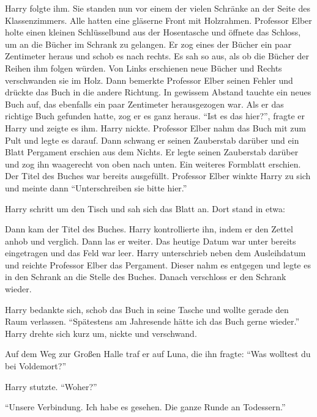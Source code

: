 Harry folgte ihm. Sie standen nun vor einem der vielen Schränke an der Seite des Klassenzimmers. Alle hatten eine gläserne Front mit Holzrahmen. Professor Elber holte einen kleinen Schlüsselbund aus der Hosentasche und öffnete das Schloss, um an die Bücher im Schrank zu gelangen. Er zog eines der Bücher ein paar Zentimeter heraus und schob es nach rechts. Es sah so aus, als ob die Bücher der Reihen ihm folgen würden. Von Links erschienen neue Bücher und Rechts verschwanden sie im Holz. Dann bemerkte Professor Elber seinen Fehler und drückte das Buch in die andere Richtung. In gewissem Abstand tauchte ein neues Buch auf, das ebenfalls ein paar Zentimeter herausgezogen war. Als er das richtige Buch gefunden hatte, zog er es ganz heraus. \enquote{Ist es das hier?}, fragte er Harry und zeigte es ihm. Harry nickte. Professor Elber nahm das Buch mit zum Pult und legte es darauf. Dann schwang er seinen Zauberstab darüber und ein Blatt Pergament erschien aus dem Nichts. Er legte seinen Zauberstab darüber und zog ihn waagerecht von oben nach unten. Ein weiteres Formblatt erschien. Der Titel des Buches war bereits ausgefüllt. Professor Elber winkte Harry zu sich und meinte dann \enquote{Unterschreiben sie bitte hier.}

Harry schritt um den Tisch und sah sich das Blatt an. Dort stand in etwa:


Dann kam der Titel des Buches. Harry kontrollierte ihn, indem er den Zettel anhob und verglich. Dann las er weiter. Das heutige Datum war unter  bereits eingetragen und das Feld  war leer. Harry unterschrieb neben dem Ausleihdatum und reichte Professor Elber das Pergament. Dieser nahm es entgegen und legte es in den Schrank an die Stelle des Buches. Danach verschloss er den Schrank wieder.

Harry bedankte sich, schob das Buch in seine Tasche und wollte gerade den Raum verlassen. \enquote{Spätestens am Jahresende hätte ich das Buch gerne wieder.} Harry drehte sich kurz um, nickte und verschwand.

\trenn

Auf dem Weg zur Großen Halle traf er auf Luna, die ihn fragte: \enquote{Was wolltest du bei Voldemort?}

Harry stutzte. \enquote{Woher?}

\enquote{Unsere Verbindung. Ich habe es gesehen. Die ganze Runde an Todessern.}

